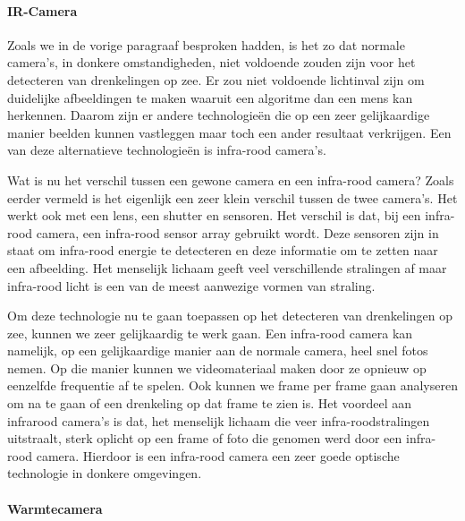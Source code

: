 \paragraph{IR-Camera}

\subitem
Zoals we in de vorige paragraaf besproken hadden, is het zo dat normale camera's, in donkere omstandigheden, niet voldoende zouden zijn voor het detecteren van drenkelingen op zee. Er zou niet voldoende lichtinval zijn om duidelijke afbeeldingen te maken waaruit een algoritme dan een mens kan herkennen. Daarom zijn er andere technologieën die op een zeer gelijkaardige manier beelden kunnen vastleggen maar toch een ander resultaat verkrijgen. Een van deze alternatieve technologieën is infra-rood camera's. 

\subitem
Wat is nu het verschil tussen een gewone camera en een infra-rood camera? Zoals eerder vermeld is het eigenlijk een zeer klein verschil tussen de twee camera's. Het werkt ook met een lens, een shutter en sensoren. Het verschil is dat, bij een infra-rood camera, een infra-rood sensor array gebruikt wordt. Deze sensoren zijn in staat om infra-rood energie te detecteren en deze informatie om te zetten naar een afbeelding. Het menselijk lichaam geeft veel verschillende stralingen af maar infra-rood licht is een van de meest aanwezige vormen van straling.

\subitem
Om deze technologie nu te gaan toepassen op het detecteren van drenkelingen op zee, kunnen we zeer gelijkaardig te werk gaan. Een infra-rood camera kan namelijk, op een gelijkaardige manier aan de normale camera, heel snel fotos nemen. Op die manier kunnen we videomateriaal maken door ze opnieuw op eenzelfde frequentie af te spelen. Ook kunnen we frame per frame gaan analyseren om na te gaan of een drenkeling op dat frame te zien is. Het voordeel aan infrarood camera's is dat, het menselijk lichaam die veer infra-roodstralingen uitstraalt, sterk oplicht op een frame of foto die genomen werd door een infra-rood camera. Hierdoor is een infra-rood camera een zeer goede optische technologie in donkere omgevingen. 

\paragraph{Warmtecamera}

